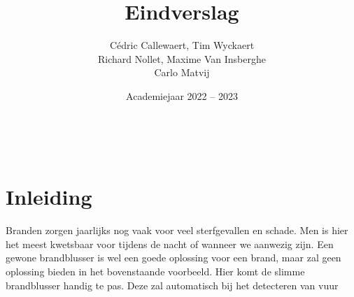 \documentclass[kulak]{kulakarticle} %
\title{Eindverslag}
\author{Cédric Callewaert, Tim Wyckaert \\ Richard Nollet, Maxime Van Insberghe \\ Carlo Matvij}
\date{Academiejaar 2022 -- 2023}
\begin{document}
\maketitle
\\
\section*{Inleiding}

Branden zorgen jaarlijks nog vaak voor veel sterfgevallen en schade.
Men is hier het meest kwetsbaar voor tijdens de nacht of wanneer we aanwezig zijn. Een gewone brandblusser is wel een goede oplossing voor een brand, maar zal geen oplossing bieden in het bovenstaande voorbeeld. Hier komt de slimme brandblusser handig te pas. Deze zal automatisch bij het detecteren van vuur 
\end{document}
